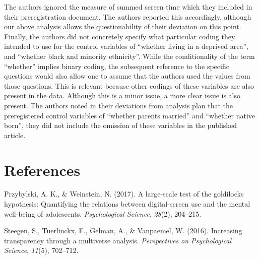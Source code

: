 \documentclass[floatsintext,man]{apa6}
\theoremstyle{definition}
\theoremstyle{definition}
\theoremstyle{definition}
\theoremstyle{remark}
\begin{document}
The authors ignored the measure of summed screen time which they
included in their preregistration document. The authors reported this
accordingly, although our above analysis allows the questionability of
their deviation on this point. Finally, the authors did not concretely
specify what particular coding they intended to use for the control
variables of \enquote{whether living in a deprived area}, and
\enquote{whether black and minority ethnicity}. While the conditionality
of the term \enquote{whether} implies binary coding, the subsequent
reference to the specific questions would also allow one to assume that
the authors used the values from those questions. This is relevant
because other codings of these variables are also present in the data.
Although this is a minor issue, a more clear issue is also present. The
authors noted in their deviations from analysis plan that the
preregistered control variables of \enquote{whether parents married} and
\enquote{whether native born}, they did not include the omission of
these variables in the published article.

\newpage

\hypertarget{references}{%
\section{References}\label{references}}

\begingroup
\setlength{\parindent}{-0.5in}
\setlength{\leftskip}{0.5in}

\hypertarget{refs}{}
\leavevmode\hypertarget{ref-przybylski2017large}{}%
Przybylski, A. K., \& Weinstein, N. (2017). A large-scale test of the
goldilocks hypothesis: Quantifying the relations between digital-screen
use and the mental well-being of adolescents. \emph{Psychological
Science}, \emph{28}(2), 204--215.

\leavevmode\hypertarget{ref-steegen2016increasing}{}%
Steegen, S., Tuerlinckx, F., Gelman, A., \& Vanpaemel, W. (2016).
Increasing transparency through a multiverse analysis.
\emph{Perspectives on Psychological Science}, \emph{11}(5), 702--712.

\endgroup


\clearpage
\renewcommand{\listtablename}{Table captions}
\listoftables
\end{document}
